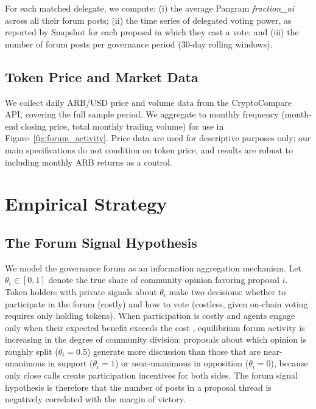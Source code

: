 \documentclass[12pt]{article}
\begin{document}
For each matched delegate, we compute: (i) the average Pangram \textit{fraction\_ai}
across all their forum posts; (ii) the time series of delegated voting power, as
reported by Snapshot for each proposal in which they cast a vote; and (iii) the
number of forum posts per governance period (30-day rolling windows).

\subsection{Token Price and Market Data}

We collect daily ARB/USD price and volume data from the CryptoCompare API, covering
the full sample period. We aggregate to monthly frequency (month-end closing price,
total monthly trading volume) for use in Figure~\ref{fig:forum_activity}. Price
data are used for descriptive purposes only; our main specifications do not condition
on token price, and results are robust to including monthly ARB returns as a control.



\section{Empirical Strategy}
\label{sec:strategy}


\subsection{The Forum Signal Hypothesis}

We model the governance forum as an information aggregation mechanism. Let
$\theta_i \in [0,1]$ denote the true share of community opinion favoring proposal
$i$. Token holders with private signals about $\theta_i$ make two decisions:
whether to participate in the forum (costly) and how to vote (costless, given
on-chain voting requires only holding tokens). When participation is costly and agents engage only when their expected benefit
exceeds the cost \citep{downs1957}, equilibrium forum activity is
increasing in the degree of community division: proposals about which opinion
is roughly split ($\theta_i = 0.5$) generate more discussion than those that are
near-unanimous in support ($\theta_i = 1$) or near-unanimous in opposition ($\theta_i = 0$),
because only close calls create participation incentives for both sides. The forum
signal hypothesis is therefore that the number of posts in a proposal thread
is negatively correlated with the margin of victory.
\end{document}
